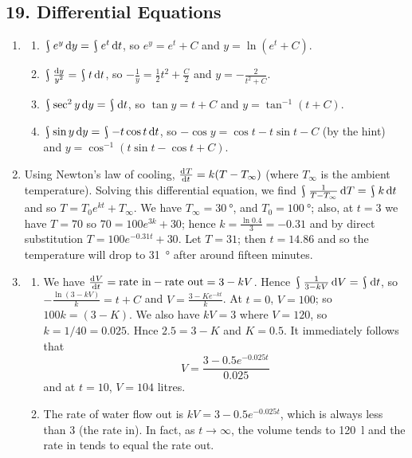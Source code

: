 \subsection*{19. Differential Equations}
\begin{enumerate}
  \item
    \begin{enumerate}
      \item $ \rint e^y \dif{y} = \rint e^t \dif{t} $, so $ e^y = e^t + C $ and $ y = \ln (e^t + C) $.
      \item $ \rint \frac{\dif{y}}{y^2} = \rint t \dif{t} $, so $ -\frac{1}{y} = \frac{1}{2} t^2 + \frac{C}{2} $ and $ y = -\frac{2}{t^2 + C} $.
      \item $ \rint \sec^2 y \dif{y} = \rint \dif{t} $, so $ \tan y = t + C $ and $ y = \tan^{-1} (t + C) $.
      \item $ \rint \sin y \dif{y} = \rint -t\cos t \dif{t} $, so $ -\cos y = \cos t - t \sin t - C $ (by the hint) and $ y = \cos^{-1} (t\sin t - \cos t + C) $.
    \end{enumerate}
  \item Using Newton's law of cooling, $ \od{T}{t} = k(T - T_\infty) $ (where $ T_\infty $ is the ambient temperature). Solving this differential
        equation, we find $ \rint \frac{1}{T - T_\infty} \dif{T} = \rint k \dif{t} $ and so $ T = T_0 e^{kt} + T_\infty $. We have $ T_\infty = \SI{30}{\degree} $,
        and $ T_0 = \SI{100}{\degree} $; also, at $ t = 3 $ we have $ T = 70 $ so $ 70 = 100e^{3k} + 30 $; hence $ k = \frac{\ln 0.4}{3} = -0.31 $ and
        by direct substitution $ T = 100e^{-0.31t} + 30 $. Let $ T = 31 $; then $ t = 14.86 $ and so the temperature will drop to \SI{31}{\degree} after
        around fifteen minutes.
  \item
    \begin{enumerate}
      \item We have $ \od{V}{t} = \text{rate in} - \text{rate out} = 3 - kV $. Hence $ \rint \frac{1}{3 - kV} \dif{V} = \rint \dif{t} $, so
            $ -\frac{\ln(3 - kV)}{k} = t + C $ and $ V = \frac{3 - Ke^{-kt}}{k} $. At $ t = 0 $, $ V = 100 $; so $ 100k = (3 - K) $. We also
            have $ kV = 3 $ where $ V = 120 $, so $ k = 1/40 = 0.025 $. Hnce $ 2.5 = 3 - K $ and $ K = 0.5 $. It immediately follows that
            \begin{displaymath}
              V = \frac{3 - 0.5e^{-0.025t}}{0.025}
            \end{displaymath}
            and at $ t = 10 $, $ V = 104 $ litres.
      \item The rate of water flow out is $ kV = 3 - 0.5e^{-0.025t} $, which is always less than 3 (the rate in). In fact, as $ t \to \infty $,
            the volume tends to \SI{120}{\litre} and the rate in tends to equal the rate out.
    \end{enumerate}
\end{enumerate}

